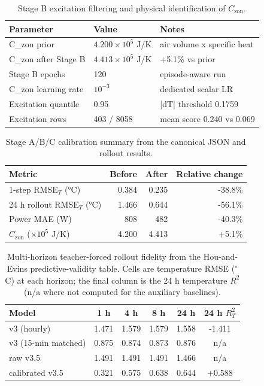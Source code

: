\documentclass[11pt,a4paper]{article}
\newcommand{\Czon}{\ensuremath{C_{\mathrm{zon}}}}
\begin{document}
\begin{table}[H]
\centering
\small
\caption{Stage B excitation filtering and physical identification of \(\Czon\).}
\label{tab:stage-b}
\begin{tabularx}{\linewidth}{llX}
\toprule
Parameter & Value & Notes \\
\midrule
C\_zon prior & $4.200\times10^5$ J/K & air volume x specific heat \\
C\_zon after Stage B & $4.413\times10^5$ J/K & +5.1\% vs prior \\
Stage B epochs & 120 & episode-aware run \\
C\_zon learning rate & $10^{-3}$ & dedicated scalar LR \\
Excitation quantile & 0.95 & |dT| threshold 0.1759 \\
Excitation rows & 403 / 8058 & mean score 0.240 vs 0.069 \\
\bottomrule
\end{tabularx}
\end{table}
\begin{table}[H]
\centering
\small
\caption{Stage A/B/C calibration summary from the canonical JSON and rollout results.}
\label{tab:stage-abc}
\begin{tabular}{lrrr}
\toprule
Metric & Before & After & Relative change \\
\midrule
1-step RMSE$_T$ (\si{\celsius}) & 0.384 & 0.235 & -38.8\% \\
24 h rollout RMSE$_T$ (\si{\celsius}) & 1.466 & 0.644 & -56.1\% \\
Power MAE (\si{\watt}) & 808 & 482 & -40.3\% \\
$\Czon$ ($\times 10^5$ J/K) & 4.200 & 4.413 & +5.1\% \\
\bottomrule
\end{tabular}
\end{table}
\begin{table}[H]
\centering
\small
\caption{Multi-horizon teacher-forced rollout fidelity from the Hou-and-Evins predictive-validity table. Cells are temperature RMSE (\(^\circ\)C) at each horizon; the final column is the 24 h temperature \(R^2\) (n/a where not computed for the auxiliary baselines).}
\label{tab:multi-horizon}
\begin{tabular}{lccccc}
\toprule
Model & 1 h & 4 h & 8 h & 24 h & 24 h \(R^2_T\) \\
\midrule
v3 (hourly) & 1.471 & 1.579 & 1.579 & 1.558 & -1.411 \\
v3 (15-min matched) & 0.875 & 0.874 & 0.873 & 0.876 & n/a \\
raw v3.5 & 1.491 & 1.491 & 1.491 & 1.466 & n/a \\
calibrated v3.5 & 0.321 & 0.575 & 0.638 & 0.644 & +0.588 \\
\bottomrule
\end{tabular}
\end{table}
\end{document}
